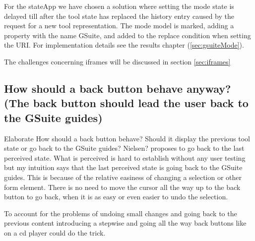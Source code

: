 \documentclass[english]{ifimaster}
\begin{document}
For the stateApp we have chosen a solution where setting the mode state is delayed till after the tool state has replaced the history entry caused by the request for a new tool representation. The mode model is marked, adding a property with the name GSuite, and added to the replace condition when setting the URI. For implementation details see the results chapter (\ref{sec:gsuiteMode}).

The challenges concerning iframes will be discussed in section \ref{sec:iframes}


\subsection{How should a back button behave anyway? (The back button should lead the user back to the GSuite guides)} Elaborate
\label{sec:backButton}
How should a back button behave? Should it display the previous tool state or go back to the GSuite guides? Nielsen? proposes to go back to the last perceived state. What is perceived is hard to establish without any user testing but my intuition says that the last perceived state is going back to the GSuite guides. This is because of the relative easiness of changing a selection or other form element. There is no need to move the cursor all the way up to the back button to go back, when it is as easy or even easier to undo the selection. 

To account for the problems of undoing small changes and going back to the previous content introducing a stepwise and going all the way back buttons like on a cd player could do the trick.






\end{document}
